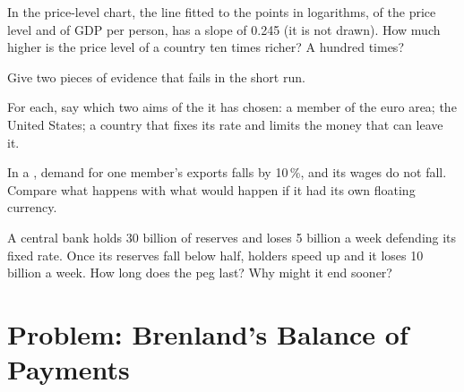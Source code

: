 \begin{exercise}[$\star\star$]\label{exo:g12:exchange-rates-and-balance-of-payments:11}
In the price-level chart, the line fitted to the points in logarithms, of the price level and of GDP per person, has a slope of 0.245 (it is not
drawn). How much higher is the price level of a country ten times richer? A hundred times?
\end{exercise}

\begin{exercise}[$\star\star\star$]\label{exo:g12:exchange-rates-and-balance-of-payments:12}
Give two pieces of evidence that  fails in the short run.
\end{exercise}

\begin{exercise}[$\star\star\star$]\label{exo:g12:exchange-rates-and-balance-of-payments:13}
For each, say which two aims of the  it has chosen: a member of the euro area; the United States; a country that fixes its rate and limits the money that
can leave it.
\end{exercise}

\begin{exercise}[$\star\star\star$]\label{exo:g12:exchange-rates-and-balance-of-payments:14}
In a , demand for one member's exports falls by 10\,\%, and its wages do not fall. Compare what happens with what would happen if it had its own floating
currency.
\end{exercise}

\begin{exercise}[$\star\star\star$]\label{exo:g12:exchange-rates-and-balance-of-payments:15}
A central bank holds 30 billion of reserves and loses 5 billion a week defending its fixed rate. Once its reserves fall below half, holders speed up and it loses 10 billion
a week. How long does the peg last? Why might it end sooner?
\end{exercise}

\section{Problem: Brenland's Balance of Payments}

